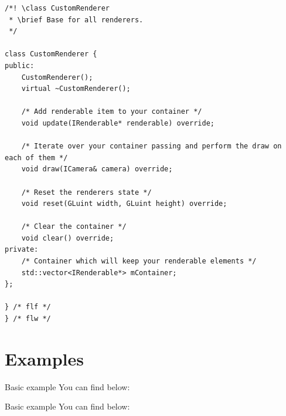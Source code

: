 \documentclass{article}
\begin{document}
\begin{lstlisting}
/*! \class CustomRenderer
 * \brief Base for all renderers.
 */

class CustomRenderer {
public:
	CustomRenderer();
	virtual ~CustomRenderer();

	/* Add renderable item to your container */
	void update(IRenderable* renderable) override;
	
	/* Iterate over your container passing and perform the draw on each of them */
	void draw(ICamera& camera) override;
	
	/* Reset the renderers state */
	void reset(GLuint width, GLuint height) override;
	
	/* Clear the container */
	void clear() override;
private:
	/* Container which will keep your renderable elements */
	std::vector<IRenderable*> mContainer;
};

} /* flf */
} /* flw */

\end{lstlisting}

\section{Examples}

Basic example You can find below:


Basic example You can find below:
\newpage

\large
\end{document}

